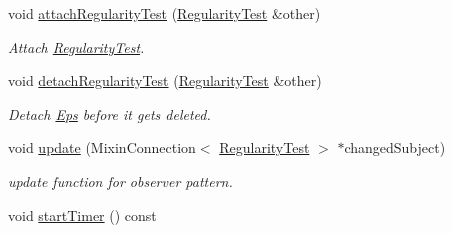 \begin{DoxyCompactItemize}
void \hyperlink{classSpacy_1_1Mixin_1_1RegularityTest_aeb6598687d622ef266d1ed515d2b42bf_aeb6598687d622ef266d1ed515d2b42bf}{attach\+Regularity\+Test} (\hyperlink{classSpacy_1_1Mixin_1_1RegularityTest_ae2887fec9a5bdd42239b3df6750bf2e9_ae2887fec9a5bdd42239b3df6750bf2e9}{Regularity\+Test} \&other)
\begin{DoxyCompactList}\small\item\em Attach \hyperlink{classSpacy_1_1Mixin_1_1RegularityTest}{Regularity\+Test}. \end{DoxyCompactList}\item 
\hypertarget{classSpacy_1_1Mixin_1_1RegularityTest_a289d6422bd82864d661bdbcfc7dc321e}{}void \hyperlink{classSpacy_1_1Mixin_1_1RegularityTest_a289d6422bd82864d661bdbcfc7dc321e}{detach\+Regularity\+Test} (\hyperlink{classSpacy_1_1Mixin_1_1RegularityTest_ae2887fec9a5bdd42239b3df6750bf2e9_ae2887fec9a5bdd42239b3df6750bf2e9}{Regularity\+Test} \&other)\label{classSpacy_1_1Mixin_1_1RegularityTest_a289d6422bd82864d661bdbcfc7dc321e}

\begin{DoxyCompactList}\small\item\em Detach \hyperlink{classSpacy_1_1Mixin_1_1Eps}{Eps} before it gets deleted. \end{DoxyCompactList}\item 
\hypertarget{classSpacy_1_1Mixin_1_1RegularityTest_ae3bfc55bec9fe3068adffb6d24b3b964}{}void \hyperlink{classSpacy_1_1Mixin_1_1RegularityTest_ae3bfc55bec9fe3068adffb6d24b3b964}{update} (Mixin\+Connection$<$ \hyperlink{classSpacy_1_1Mixin_1_1RegularityTest_ae2887fec9a5bdd42239b3df6750bf2e9_ae2887fec9a5bdd42239b3df6750bf2e9}{Regularity\+Test} $>$ $\ast$changed\+Subject)\label{classSpacy_1_1Mixin_1_1RegularityTest_ae3bfc55bec9fe3068adffb6d24b3b964}

\begin{DoxyCompactList}\small\item\em update function for observer pattern. \end{DoxyCompactList}\item 
\hypertarget{classSpacy_1_1Mixin_1_1Timer_acf3c292b6d482c7c4ded5f961be4bc4b}{}void \hyperlink{classSpacy_1_1Mixin_1_1Timer_acf3c292b6d482c7c4ded5f961be4bc4b}{start\+Timer} () const\label{classSpacy_1_1Mixin_1_1Timer_acf3c292b6d482c7c4ded5f961be4bc4b}


\end{DoxyCompactItemize}
